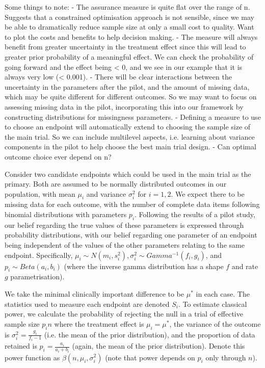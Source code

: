 \documentclass{article} %
\begin{document}
Some things to note:
- The assurance measure is quite flat over the range of n. Suggests that a constrained optimisation approach is not sensible, since we may be able to dramatically reduce sample size at only a small cost to quality. Want to plot the costs and benefits to help decision making.
- The measure will always benefit from greater uncertainty in the treatment effect since this will lead to greater prior probability of a meaningful effect. We can check the probability of going forward and the effect being < 0, and we see in our example that it is always very low (< 0.001).
- There will be clear interactions between the uncertainty in the parameters after the pilot, and the amount of missing data, which may be quite different for different outcomes. So we may want to focus on assessing missing data in the pilot, incorporating this into our framework by constructing distributions for missingness parameters. 
- Defining a measure to use to choose an endpoint will automatically extend to choosing the sample size of the main trial. So we can include multilevel aspects, i.e. learning about variance components in the pilot to help choose the best main trial design.
- Can optimal outcome choice ever depend on n?

Consider two candidate endpoints which could be used in the main trial as the primary. Both are assumed to be normally distributed outcomes in our population, with mean $\mu_{i}$ and variance $\sigma^{2}_{i}$ for $i = 1,2$. We expect there to be missing data for each outcome, with the number of complete data items following binomial distributions with parameters $p_{i}$. Following the results of a pilot study, our belief regarding the true values of these parameters is expressed through probability distributions, with our belief regarding one parameter of an endpoint being independent of the values of the other parameters relating to the same endpoint. Specifically, $\mu_{i} \sim N(m_{i}, s^{2}_{i}), \sigma^{2}_{i} \sim Gamma^{-1}(f_{i}, g_{i})$, and $p_{i} \sim Beta(a_{i}, b_{i})$ (where the inverse gamma distribution has a shape $f$ and rate $g$ parametrisation).

We take the minimal clinically important difference to be $\mu^{*}$ in each case. The statistics used to measure each endpoint are denoted $S_{i}$. To estimate classical power, we calculate the probability of rejecting the null in a trial of effective sample size $p_{i}n$ where the treatment effect is $\mu_{i}=\mu^{*}$, the variance of the outcome is $\sigma^{2}_{i}=\frac{g_{i}}{f_{i}-1}$ (i.e. the mean of the prior distribution), and the proportion of data retained is $p_{i} = \frac{a_{i}}{a_{i}+b_{i}}$ (again, the mean of the prior distribution). Denote this power function as $\beta(n, \mu_{i}, \sigma^{2}_{i})$ (note that power depends on $p_{i}$ only through $n$).
\end{document}
